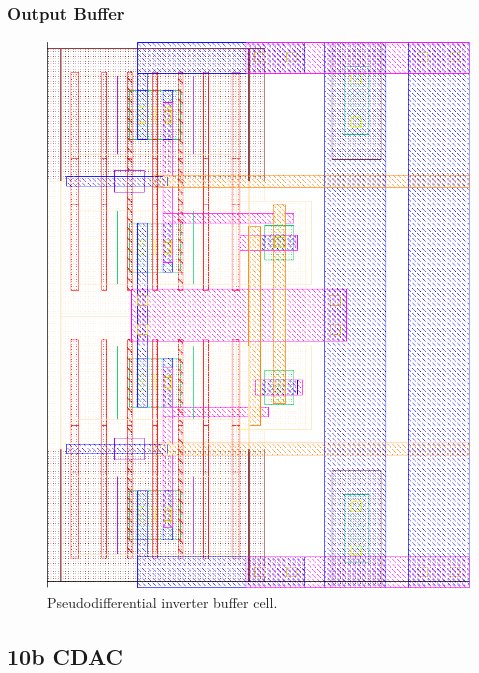 			\subsubsection{Output Buffer}\label{sec:lay_buff}
				\begin{figure}[htb!]
				        \centering
				        \includegraphics[height=0.4\textheight, angle=0]{./figs/layout/buffer}
				    \caption{Pseudodifferential inverter buffer cell.}
				\end{figure}
		\FloatBarrier\pagebreak
		\subsection{10b CDAC}\label{sec:lay_cdac_10b}
